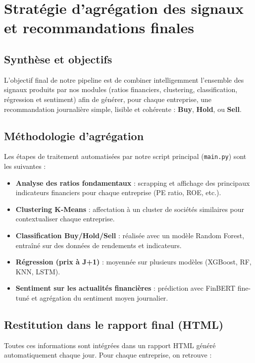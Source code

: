 \documentclass[a4paper,12pt]{article}
\begin{document}
\section{Stratégie d’agrégation des signaux et recommandations finales}

\subsection*{Synthèse et objectifs}

L’objectif final de notre pipeline est de combiner intelligemment l’ensemble des signaux produits par nos modules (ratios financiers, clustering, classification, régression et sentiment) afin de générer, pour chaque entreprise, une recommandation journalière simple, lisible et cohérente : \textbf{Buy}, \textbf{Hold}, ou \textbf{Sell}.

\subsection*{Méthodologie d’agrégation}

Les étapes de traitement automatisées par notre script principal (\texttt{main.py}) sont les suivantes :

\begin{itemize}
    \item \textbf{Analyse des ratios fondamentaux} : scrapping et affichage des principaux indicateurs financiers pour chaque entreprise (PE ratio, ROE, etc.).
    \item \textbf{Clustering K-Means} : affectation à un cluster de sociétés similaires pour contextualiser chaque entreprise.
    \item \textbf{Classification Buy/Hold/Sell} : réalisée avec un modèle Random Forest, entraîné sur des données de rendements et indicateurs.
    \item \textbf{Régression (prix à J+1)} : moyennée sur plusieurs modèles (XGBoost, RF, KNN, LSTM).
    \item \textbf{Sentiment sur les actualités financières} : prédiction avec FinBERT fine-tuné et agrégation du sentiment moyen journalier.
\end{itemize}

\subsection*{Restitution dans le rapport final (HTML)}

Toutes ces informations sont intégrées dans un rapport HTML généré automatiquement chaque jour. Pour chaque entreprise, on retrouve :
\end{document}
